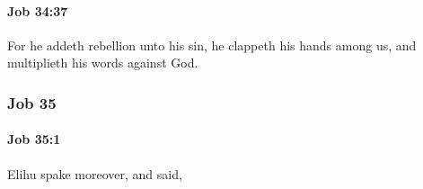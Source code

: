 		\paragraph{Job 34:37} %
			\label{JOB-34-37}

			For he addeth rebellion unto his sin, he clappeth his hands among us, and multiplieth his words against God.

	\subsubsection{Job 35} %
		\label{JOB-35}

		\paragraph{Job 35:1} %
			\label{JOB-35-1}

			Elihu spake moreover, and said,


